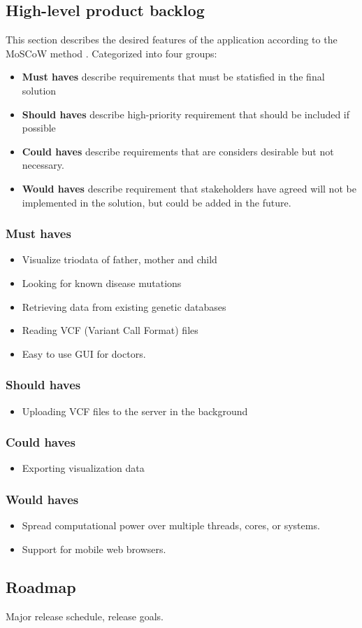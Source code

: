 \subsection{High-level product backlog}
This section describes the desired features of the application according to the MoSCoW method \cite{brennan2009guide}. Categorized into four groups:
\begin{itemize}
\item \textbf{Must haves} describe requirements that must be statisfied in the final solution
\item \textbf{Should haves} describe high-priority requirement that should be included if possible
\item \textbf{Could haves} describe requirements that are considers desirable but not necessary.
\item \textbf{Would haves} describe requirement that stakeholders have agreed will not be implemented in the solution, but could be added in the future.
\end{itemize}

\subsubsection{Must haves}
\begin{itemize}
\item Visualize triodata of father, mother and child
\item Looking for known disease mutations
\item Retrieving data from existing genetic databases
\item Reading VCF (Variant Call Format) files 
\item Easy to use GUI for doctors.
\end{itemize}

\subsubsection{Should haves}
\begin{itemize}
\item Uploading VCF files to the server in the background
\end{itemize}


\subsubsection{Could haves}
\begin{itemize}
\item Exporting visualization data
\end{itemize}

\subsubsection{Would haves}
\begin{itemize}
\item Spread computational power over multiple threads, cores, or systems.
\item Support for mobile web browsers.
\end{itemize}

\subsection{Roadmap}
Major release schedule, release goals.
